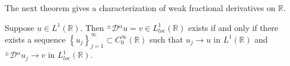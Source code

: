 \documentclass[leqno,final]{siamltex}
\numberwithin{equation}{section}
\newcommand{\eps}{\varepsilon}
\renewcommand{\(}{\bigl(}
\renewcommand{\)}{\bigr)}
\newcommand{\R}{\mathbb{R}}
\begin{document}
        
        The next theorem gives a characterization of weak fractional derivatives on $\R$. 
        
         \begin{theorem}\label{characterization}
            Suppose $u \in L^{1}(\R)$. Then ${^{\pm}}{\mathcal{D}}{^{\alpha}} u = v \in L^{1}_{loc}(\R)$ exists if and only if there 
            exists a sequence 
              $\left\{u_j \right\}_{j=1}^{\infty} \subset C^{\infty}_{0}(\R)$ such that $u_j \rightarrow u$ in $L^{1}(\R)$ and ${^{\pm}}{\mathcal{D}}{^{\alpha}} u_j \rightarrow v$ in $L^{1}_{loc}(\R)$.
        \end{theorem}
\end{document}
